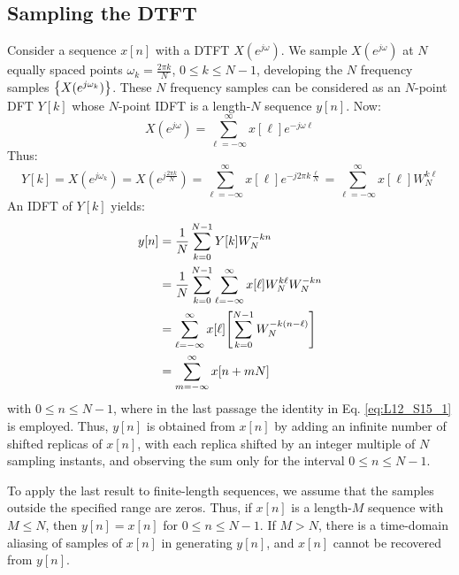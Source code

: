 \documentclass[../../main/main.tex]{subfiles}
\begin{document}
\subsection{Sampling the DTFT}
Consider a sequence \( x[n] \) with a DTFT \( X(e^{j\omega}) \). We sample \( X(e^{j\omega}) \) at \( N \) equally spaced points \( \omega_{k} = \frac{2\pi k}{N} \), \( 0 \le k \le N-1 \), developing the \( N \) frequency samples \( \qty{X(e^{j\omega_{k}})} \).
These \( N \) frequency samples can be considered as an \( N \)-point DFT \( Y[k] \) whose \( N \)-point IDFT is a length-\( N \) sequence \( y[n] \). Now:
\begin{equation}
    X(e^{j\omega})
    =
    \sum_{\ell=-\infty}^{\infty} x[\ell] e^{-j\omega \ell}
    \label{eq:L12_S26_1}
\end{equation}
Thus:
\begin{equation}
    Y[k]
    =
    X(e^{j\omega_{k}})
    =
    X(e^{j\frac{2\pi k}{N}})
    =
    \sum_{\ell=-\infty}^{\infty} x[\ell] e^{-j 2\pi k \frac{\ell}{N}}
    =
    \sum_{\ell=-\infty}^{\infty} x[\ell] W_{N}^{k\ell}
    \label{eq:L12_S26_2}
\end{equation}
An IDFT of \( Y[k] \) yields:
\begin{align}
    y[n]
    &=
        \frac{1}{N} \sum_{k=0}^{N-1} Y[k] W_{N}^{-kn}   \nonumber   \\
    &=
        \frac{1}{N} \sum_{k=0}^{N-1} \sum_{\ell=-\infty}^{\infty} x[\ell] W_{N}^{k\ell} W_{N}^{-kn} \nonumber   \\
    &=
        \sum_{\ell=-\infty}^{\infty} x[\ell] \qty[\sum_{k=0}^{N-1} W_{N}^{-k(n-\ell)}]  \nonumber   \\
    &=
        \sum_{m=-\infty}^{\infty} x[n+mN]
\end{align}
with \( 0 \le n \le N-1 \), where in the last passage the identity in Eq. \ref{eq:L12_S15_1} is employed. Thus, \( y[n] \) is obtained from \( x[n] \) by adding an infinite number of shifted replicas of \( x[n] \), with each replica shifted by an integer multiple of \( N \) sampling instants, and observing the sum only for the interval \( 0 \le n \le N-1 \).

To apply the last result to finite-length sequences, we assume that the samples outside the specified range are zeros. Thus, if \( x[n] \) is a length-\( M \) sequence with \( M \le N \), then \( y[n] = x[n] \) for \( 0 \le n \le N-1 \).
If \( M > N \), there is a time-domain aliasing of samples of \( x[n] \) in generating \( y[n] \), and \( x[n] \) cannot be recovered from \( y[n] \).
\end{document}
